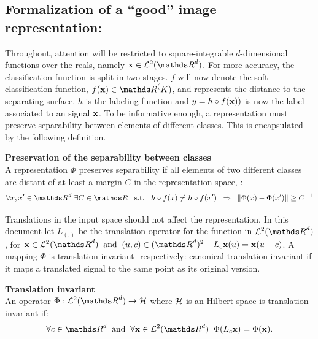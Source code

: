 \documentclass[a4paper,11pt]{report}
\begin{document}
		\subsection{Formalization of a ``good'' image representation:}
      \label{sec:Intro/Image rep/Formalization}
      
			Throughout, attention will be restricted to square-integrable $d$-dimensional functions over the reals, namely $\bfx \in \mcalL^{2}(\dsR^{d})$. For more accuracy, the classification function is split in two stages. $f$ will now denote the soft classification function, \ie $f(\bfx) \in \dsR^(K)$, and represents the distance to the separating surface. $h$ is the labeling function and $y=h \circ f({\bf x}))$ is now the label associated to an signal ${\bf x}$. To be informative enough, a representation must preserve separability between elements of different classes. This is encapsulated by the following definition.
      
			\begin{defn} \textbf{Preservation of the separability between classes}\\
				A representation $\Phi$ preserves separability if all elements of two different classes are distant of at least a margin $C$ in the representation space, \ie:
				\begin{equation*}
					\forall x,x' \in \dsR^{d} \; \exists C \in \dsR \;\;\; \st \;\;\; h \circ f(x) \neq h \circ f(x') \;\; \Rightarrow \;\; \norm{\Phi(x)-\Phi(x')} \geq C^{-1}
				\end{equation*}
				\label{def:Separability}
			\end{defn}
			
      Translations in the input space should not affect the representation. In this document let $L_{(.)}$ be the translation operator for the function in $\mcalL^{2}(\dsR^{d})$, \ie for $\bfx \in \mcalL^{2}(\dsR^{d}) \;\; \text{and} \;\; (u,c) \in (\dsR^{d})^{2} \;\;\;\; L_{c}\bfx(u) = \bfx(u-c)$. A mapping $\Phi$ is translation invariant -respectively: canonical translation invariant if it maps a translated signal to the same point as its original version.

      \begin{defn} \textbf{Translation invariant}\\ 
				An operator $\Phi: \mcalL^{2}(\dsR^{d}) \rightarrow \mcalH$ where $\mathcal{H}$ is an Hilbert space is translation invariant if:
	      	\begin{equation*}
			  		\forall c \in \dsR^{d} 
			  		\;\; \text{and}  \;\;
			  		\forall \bfx \in \mcalL^{2}(\dsR^{d}) \;\;
			  		\Phi(L_{c}\bfx) = \Phi(\bfx).
				\end{equation*}
				\label{def:Translation invariance - intuition}
      \end{defn}
      \vspace{-30pt}
\end{document}
